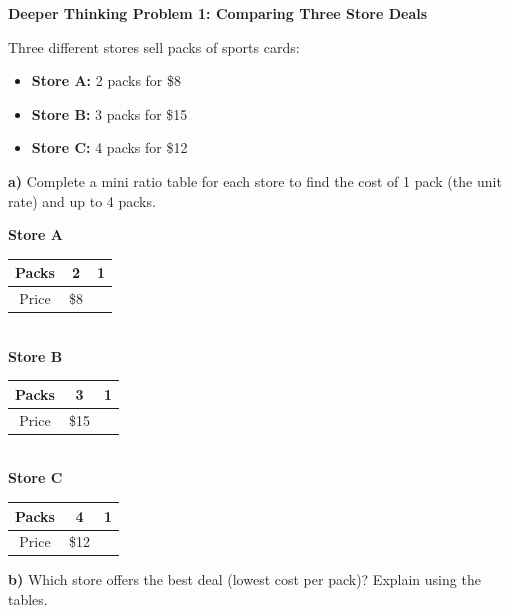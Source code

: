 \documentclass[12pt, letterpaper, fleqn]{article}
\begin{document}
\begin{tcolorbox}[colback=white!15, colframe=black, boxrule=1.5pt, arc=4mm, left=6mm, right=6mm, top=5mm, bottom=5mm]

\textbf{Deeper Thinking Problem 1: Comparing Three Store Deals}

\medskip

\noindent
Three different stores sell packs of sports cards:
\begin{itemize}
    \item \textbf{Store A:} 2 packs for \$8
    \item \textbf{Store B:} 3 packs for \$15
    \item \textbf{Store C:} 4 packs for \$12
\end{itemize}

\noindent
\textbf{a)} Complete a mini ratio table for each store to find the cost of 1 pack (the unit rate) and up to 4 packs.

\begin{center}
\textbf{Store A} \ \ \begin{tabular}{|c|c|c|} \hline Packs & 2 & 1 \\ \hline Price & \$8 &   \\ \hline \end{tabular}
\quad \\
\vspace{1cm}
\textbf{Store B} \ \ \begin{tabular}{|c|c|c|} \hline Packs & 3 & 1 \\ \hline Price & \$15 &   \\ \hline \end{tabular}
\quad \\
\vspace{1cm}
\textbf{Store C} \ \ \begin{tabular}{|c|c|c|} \hline Packs & 4 & 1 \\ \hline Price & \$12 &   \\ \hline \end{tabular}
\end{center}

\vspace{2cm}

\noindent
\textbf{b)} Which store offers the best deal (lowest cost per pack)? Explain using the tables.

\vspace{6cm}

\end{tcolorbox}
\end{document}
